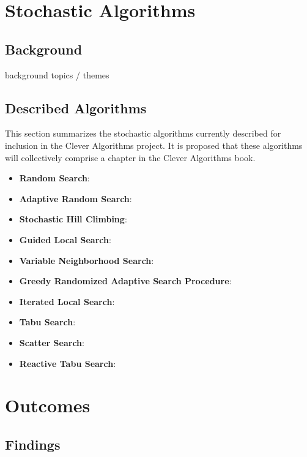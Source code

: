 \documentclass[a4paper, 11pt]{article}
\begin{document}
% 
% 
\section{Stochastic Algorithms}
\label{sec:algorithms}

% 
% 
\subsection{Background}
background topics / themes


% 
% 
\subsection{Described Algorithms}
This section summarizes the stochastic algorithms currently described for inclusion in the Clever Algorithms project. It is proposed that these algorithms will collectively comprise a chapter in the Clever Algorithms book. 

\begin{itemize}
	\item \textbf{Random Search}: \cite{Brownlee2010g}
	\item \textbf{Adaptive Random Search}: \cite{Brownlee2010h}
	\item \textbf{Stochastic Hill Climbing}: \cite{Brownlee2010i}
	\item \textbf{Guided Local Search}: \cite{Brownlee2010j}
	\item \textbf{Variable Neighborhood Search}: \cite{Brownlee2010e}
	\item \textbf{Greedy Randomized Adaptive Search Procedure}: \cite{Brownlee2010d}
	\item \textbf{Iterated Local Search}: \cite{Brownlee2010k}
	\item \textbf{Tabu Search}: \cite{Brownlee2010f}
	\item \textbf{Scatter Search}: \cite{Brownlee2010l}
	\item \textbf{Reactive Tabu Search}: \cite{Brownlee2010m}
\end{itemize}

% 
% 
\section{Outcomes}
\label{sec:outcomes}

% 
% 
\subsection{Findings}
\end{document}
